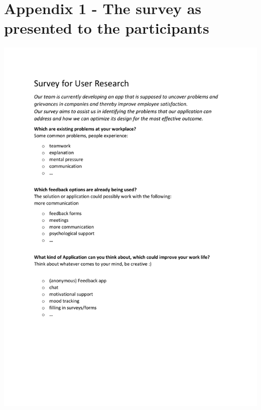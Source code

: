 \documentclass[11pt]{article}
\begin{document}
\section{Appendix 1 - The survey as presented to the participants}
\includegraphics[height=\dimexpr\textheight-1\baselineskip\relax,page=1]{figures/UID - Survey 1 as Appendix.pdf}
\end{document}
